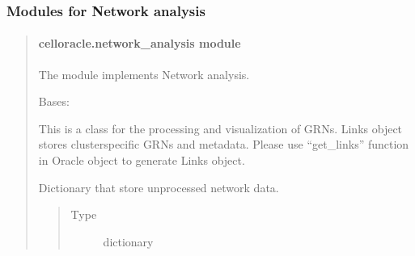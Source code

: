 \documentclass[letterpaper,10pt,english]{sphinxmanual}
\begin{document}
\subsubsection{Modules for Network analysis}
\label{\detokenize{modules/celloracle:modules-for-network-analysis}}\begin{quote}


\paragraph{celloracle.network\_analysis module}
\label{\detokenize{modules/celloracle.network_analysis:module-celloracle.network_analysis}}\label{\detokenize{modules/celloracle.network_analysis:celloracle-network-analysis-module}}\label{\detokenize{modules/celloracle.network_analysis::doc}}
The {\hyperref[\detokenize{modules/celloracle.network_analysis:module-celloracle.network_analysis}]{}} module implements Network analysis.

\begin{fulllineitems}
\label{\detokenize{modules/celloracle.network_analysis:celloracle.network_analysis.Links}}
Bases: 

This is a class for the processing and visualization of GRNs.
Links object stores cluster\sphinxhyphen{}specific GRNs and metadata.
Please use “get\_links” function in Oracle object to generate Links object.

\begin{fulllineitems}
\label{\detokenize{modules/celloracle.network_analysis:celloracle.network_analysis.Links.links_dict}}
Dictionary that store unprocessed network data.
\begin{quote}\begin{description}
\item[{Type}] \leavevmode
dictionary


\end{description}
\end{quote}
\end{fulllineitems}
\end{fulllineitems}
\end{quote}
\end{document}

